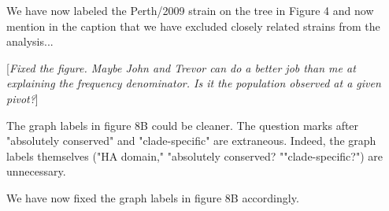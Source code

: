 \documentclass[11pt, oneside]{article}   	%
\newcommand{\comment}[1]{{\color{red}[\textsl{#1}]}}
\newcommand{\response}[1]{{\color{black}#1}}
\begin{document}
\response{We have now labeled the Perth/2009 strain on the tree in Figure 4 and now mention in the caption that we have excluded closely related strains from the analysis...
}

\comment{Fixed the figure. Maybe John and Trevor can do a better job than me at explaining the frequency denominator. Is it the population observed at a given pivot?}

The graph labels in figure 8B could be cleaner. The question marks after "absolutely conserved" and "clade-specific" are extraneous. Indeed, the graph labels themselves ("HA domain," "absolutely conserved? ""clade-specific?") are unnecessary. 

\response{We have now fixed the graph labels in figure 8B accordingly.}
\end{document}
